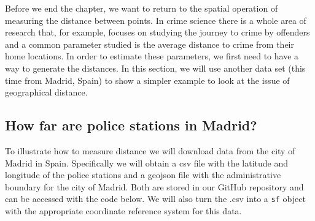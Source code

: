 \documentclass[
  krantz2]{krantz}
\makeatletter
\newenvironment{Shaded}{\begin{snugshade}}{\end{snugshade}}
\newcommand{\AttributeTok}[1]{\textcolor[rgb]{0.61,0.61,0.61}{#1}}
\newcommand{\CommentTok}[1]{\textcolor[rgb]{0.37,0.37,0.37}{\textit{#1}}}
\newcommand{\DecValTok}[1]{\textcolor[rgb]{0.06,0.06,0.06}{#1}}
\newcommand{\FunctionTok}[1]{\textcolor[rgb]{0,0,0}{#1}}
\newcommand{\NormalTok}[1]{#1}
\newcommand{\OtherTok}[1]{\textcolor[rgb]{0.37,0.37,0.37}{#1}}
\newcommand{\SpecialCharTok}[1]{\textcolor[rgb]{0,0,0}{#1}}
\newcommand{\StringTok}[1]{\textcolor[rgb]{0.5,0.5,0.5}{#1}}
\newenvironment{kframe}{%
\medskip{}
\setlength{\fboxsep}{.8em}
 \def\at@end@of@kframe{}%
 \ifinner\ifhmode%
  \def\at@end@of@kframe{\end{minipage}}%
  \begin{minipage}{\columnwidth}%
 \fi\fi%
 \def\FrameCommand##1{\hskip\@totalleftmargin \hskip-\fboxsep
 \colorbox{shadecolor}{##1}\hskip-\fboxsep
     \hskip-\linewidth \hskip-\@totalleftmargin \hskip\columnwidth}%
 \MakeFramed {\advance\hsize-\width
   \@totalleftmargin\z@ \linewidth\hsize
   \@setminipage}}%
 {\par\unskip\endMakeFramed%
 \at@end@of@kframe}
\renewenvironment{Shaded}{\begin{kframe}}{\end{kframe}}
\makeatother
\begin{document}
Before we end the chapter, we want to return to the spatial operation of measuring the distance between points. In crime science there is a whole area of research that, for example, focuses on studying the journey to crime by offenders and a common parameter studied is the average distance to crime from their home locations. In order to estimate these parameters, we first need to have a way to generate the distances. In this section, we will use another data set (this time from Madrid, Spain) to show a simpler example to look at the issue of geographical distance.

\hypertarget{how-far-are-police-stations-in-madrid}{%
\subsection{How far are police stations in Madrid?}\label{how-far-are-police-stations-in-madrid}}

To illustrate how to measure distance we will download data from the city of Madrid in Spain. Specifically we will obtain a csv file with the latitude and longitude of the police stations and a geojson file with the administrative boundary for the city of Madrid. Both are stored in our GitHub repository and can be accessed with the code below. We will also turn the .csv into a \texttt{sf} object with the appropriate coordinate reference system for this data.

\begin{Shaded}
\end{Shaded}
\end{document}
